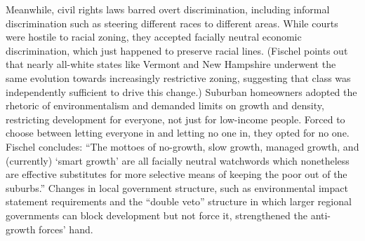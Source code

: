 Meanwhile, civil rights laws barred overt discrimination, including informal
discrimination such as steering different races to different areas. While courts
were hostile to racial zoning, they accepted facially neutral economic
discrimination, which just happened to preserve racial lines. (Fischel points
out that nearly all-white states like Vermont and New Hampshire underwent the
same evolution towards increasingly restrictive zoning, suggesting that class
was independently sufficient to drive this change.) Suburban homeowners adopted
the rhetoric of environmentalism and demanded limits on growth and density,
restricting development for everyone, not just for low-income people. Forced to
choose between letting everyone in and letting no one in, they opted for no one.
Fischel concludes: ``The mottoes of no-growth, slow growth, managed growth, and
(currently) `smart growth' are all facially neutral watchwords which nonetheless
are effective substitutes for more selective means of keeping the poor out of
the suburbs.'' Changes in local government structure, such as environmental
impact statement requirements and the ``double veto'' structure in which larger
regional governments can block development but not force it, strengthened the
anti-growth forces' hand.

